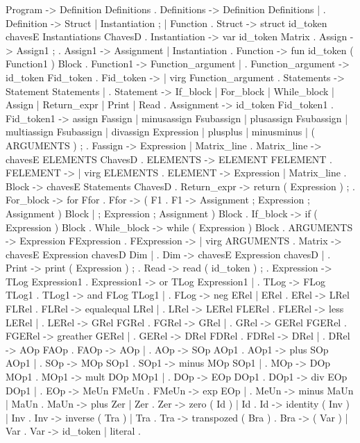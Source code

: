 Program ->   Definition Definitions .
Definitions -> Definition Definitions | .
Definition ->    Struct |   Instantiation ; |   Function .
Struct ->    struct id_token chavesE Instantiations ChavesD .
Instantiation ->	var id_token Matrix .
Assign ->    Assign1 ; .
Assign1 ->   Assignment |   Instantiation .
Function ->  fun id_token ( Function1 ) Block .
Function1 -> Function_argument |    .
Function_argument -> id_token Fid_token .
Fid_token ->  |   virg Function_argument .
Statements -> Statement Statements |  .
Statement -> If_block | For_block |   While_block |   Assign |   Return_expr |   Print |   Read .
Assignment ->    id_token Fid_token1 .
Fid_token1 ->    assign Fassign |   minusassign Fsubassign |   plusassign Fsubassign |   multiassign Fsubassign |   divassign Expression |   plusplus |   minusminus | ( ARGUMENTS ) ; .
Fassign ->   Expression |   Matrix_line .
Matrix_line ->   chavesE ELEMENTS ChavesD .
ELEMENTS ->  ELEMENT FELEMENT .
FELEMENT ->   |   virg ELEMENTS .
ELEMENT ->   Expression |   Matrix_line .
Block -> chavesE Statements ChavesD .
Return_expr ->   return ( Expression ) ; .
For_block -> for Ffor .
Ffor ->  ( F1 .
F1 ->    Assignment ; Expression ; Assignment ) Block |    ; Expression ; Assignment ) Block .
If_block ->  if ( Expression ) Block .
While_block ->   while ( Expression ) Block .
ARGUMENTS -> Expression FExpression .
FExpression ->  |   virg ARGUMENTS .
Matrix ->    chavesE Expression chavesD Dim | .
Dim ->   chavesE Expression chavesD |    .
Print -> print ( Expression ) ; .
Read ->  read ( id_token ) ; .
Expression ->    TLog Expression1 .
Expression1 ->   or TLog Expression1 |     .
TLog ->  FLog TLog1 .
TLog1 -> and FLog TLog1 |     .
FLog ->  neg ERel |   ERel .
ERel ->  LRel FLRel .
FLRel -> equalequal LRel |     .
LRel ->  LERel FLERel .
FLERel ->    less LERel |     .
LERel -> GRel FGRel .
FGRel -> \leq GRel |     .
GRel ->  GERel FGERel .
FGERel ->    greather GERel |     .
GERel -> DRel FDRel .
FDRel -> \geq DRel |     .
DRel ->  AOp FAOp .
FAOp ->  \neq AOp |     .
AOp ->   SOp AOp1 .
AOp1 ->  plus SOp AOp1 |     .
SOp ->   MOp SOp1 .
SOp1 ->  minus MOp SOp1 |     .
MOp ->   DOp MOp1 .
MOp1 ->  mult DOp MOp1 |     .
DOp ->   EOp DOp1 .
DOp1 ->  div EOp DOp1 |     .
EOp ->   MeUn FMeUn .
FMeUn -> exp EOp |     .
MeUn ->  minus MaUn |   MaUn .
MaUn ->  plus Zer |   Zer .
Zer ->   zero ( Id ) |   Id .
Id ->    identity ( Inv ) |   Inv .
Inv ->   inverse ( Tra ) |   Tra .
Tra ->   transpozed ( Bra ) .
Bra ->   ( Var ) | Var .
Var ->   id_token | literal .